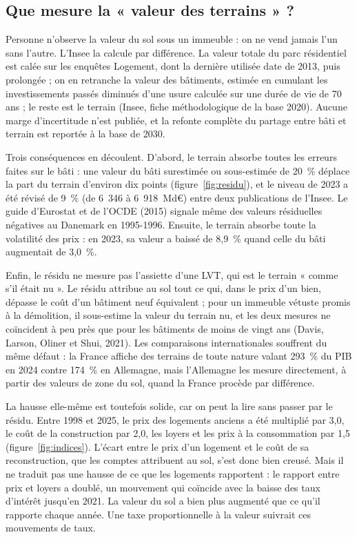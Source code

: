 \documentclass[11pt,a4paper]{article}
\begin{document}

\subsection{Que mesure la « valeur des terrains » ?}

Personne n'observe la valeur du sol sous un immeuble : on ne vend jamais l'un sans l'autre. L'Insee
la calcule par différence. La valeur totale du parc résidentiel est calée sur les enquêtes
Logement, dont la dernière utilisée date de 2013, puis prolongée ; on en retranche la valeur des
bâtiments, estimée en cumulant les investissements passés diminués d'une usure calculée sur une
durée de vie de 70 ans ; le reste est le terrain (Insee, fiche méthodologique de la base 2020).
Aucune marge d'incertitude n'est publiée, et la refonte complète du
partage entre bâti et terrain est reportée à la base de 2030.

Trois conséquences en découlent. D'abord, le terrain absorbe toutes les erreurs faites sur le
bâti : une valeur du bâti surestimée ou sous-estimée de 20~\% déplace la part du terrain d'environ dix points
(figure~\ref{fig:residu}), et le niveau de 2023 a été révisé de 9~\% (de 6~346 à 6~918~Md€) entre
deux publications de l'Insee. Le guide d'Eurostat et de l'OCDE (2015) signale même des valeurs
résiduelles négatives au Danemark en 1995-1996. Ensuite, le terrain absorbe toute la volatilité des prix : en 2023,
sa valeur a baissé de 8,9~\% quand celle du bâti augmentait de 3,0~\%.

Enfin, le résidu ne mesure pas l'assiette d'une LVT, qui est le terrain « comme s'il était
nu ». Le résidu attribue au sol tout ce qui, dans le prix d'un bien, dépasse le coût d'un bâtiment neuf
équivalent ; pour un immeuble vétuste promis à la démolition, il sous-estime la valeur du terrain
nu, et les deux mesures ne coïncident à peu près que pour les bâtiments de moins de vingt ans
(Davis, Larson, Oliner et Shui, 2021). Les comparaisons internationales souffrent du même défaut :
la France affiche des terrains de toute nature valant 293~\% du PIB en 2024 contre 174~\% en
Allemagne, mais l'Allemagne les mesure directement, à partir des valeurs de zone du sol, quand la
France procède par différence.

La hausse elle-même est toutefois solide, car on peut la lire sans passer par le résidu. Entre
1998 et 2025, le prix des logements anciens a été multiplié par 3,0, le coût de la construction
par 2,0, les loyers et les prix à la consommation par 1,5 (figure~\ref{fig:indices}). L'écart
entre le prix d'un logement et le coût de sa reconstruction, que les comptes attribuent au sol,
s'est donc bien creusé. Mais il ne traduit pas une hausse de ce que les logements rapportent : le
rapport entre prix et loyers a doublé, un mouvement qui coïncide avec la baisse des taux d'intérêt
jusqu'en 2021. La valeur du sol a bien plus augmenté que ce qu'il rapporte chaque année. Une taxe proportionnelle à la valeur suivrait ces mouvements de taux.
\end{document}
